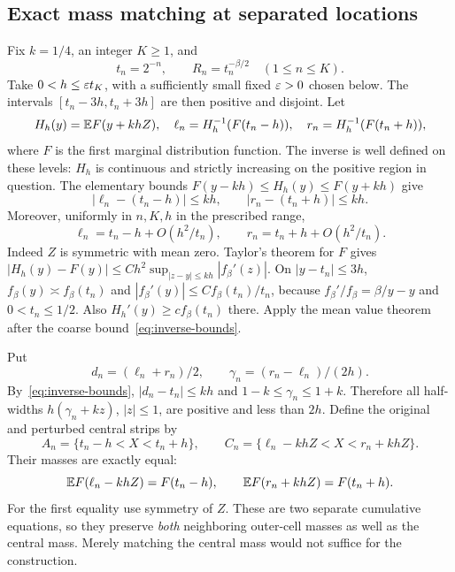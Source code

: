\documentclass[11pt]{article}
\theoremstyle{remark}\newtheorem{remark}[theorem]{Remark}
\begin{document}
\subsection{Exact mass matching at separated locations}
Fix $k=1/4$, an integer $K\ge1$, and
\[
 t_n=2^{-n},\qquad R_n=t_n^{-\beta/2}\quad(1\le n\le K).
\]
Take $0<h\le\varepsilon t_K$, with a sufficiently small fixed $\varepsilon>0$ chosen below. The intervals $[t_n-3h,t_n+3h]$ are then positive and disjoint. Let
\[
 H_h(y)=\mathbb E F(y+khZ),\quad
 \ell_n=H_h^{-1}(F(t_n-h)),\quad
 r_n=H_h^{-1}(F(t_n+h)),
\]
where $F$ is the first marginal distribution function. The inverse is well defined on these levels: $H_h$ is continuous and strictly increasing on the positive region in question. The elementary bounds
$F(y-kh)\le H_h(y)\le F(y+kh)$ give
\begin{equation}\label{eq:inverse-bounds}
 |\ell_n-(t_n-h)|\le kh,\qquad
 |r_n-(t_n+h)|\le kh.
\end{equation}
Moreover, uniformly in $n,K,h$ in the prescribed range,
\begin{equation}\label{eq:inverse-fine}
 \ell_n=t_n-h+O(h^2/t_n),\qquad
 r_n=t_n+h+O(h^2/t_n).
\end{equation}
Indeed $Z$ is symmetric with mean zero. Taylor's theorem for $F$ gives
$|H_h(y)-F(y)|\le C h^2\sup_{|z-y|\le kh}|f_\beta'(z)|$.
On $|y-t_n|\le3h$, $f_\beta(y)\asymp f_\beta(t_n)$ and
$|f_\beta'(y)|\le C f_\beta(t_n)/t_n$, because
$f_\beta'/f_\beta=\beta/y-y$ and $0<t_n\le1/2$. Also $H_h'(y)\ge c f_\beta(t_n)$ there. Apply the mean value theorem after the coarse bound~\eqref{eq:inverse-bounds}.

Put
\[
 d_n=(\ell_n+r_n)/2,\qquad \gamma_n=(r_n-\ell_n)/(2h).
\]
By~\eqref{eq:inverse-bounds}, $|d_n-t_n|\le kh$ and
$1-k\le\gamma_n\le1+k$. Therefore all half-widths
$h(\gamma_n+kz)$, $|z|\le1$, are positive and less than $2h$.
Define the original and perturbed central strips by
\[
 A_n=\{t_n-h<X<t_n+h\},\qquad
 C_n=\{\ell_n-khZ<X<r_n+khZ\}.
\]
Their masses are exactly equal:
\begin{equation}\label{eq:two-cumulative}
 \mathbb E F(\ell_n-khZ)=F(t_n-h),\qquad
 \mathbb E F(r_n+khZ)=F(t_n+h).
\end{equation}
For the first equality use symmetry of $Z$. These are two separate cumulative equations, so they preserve \emph{both} neighboring outer-cell masses as well as the central mass. Merely matching the central mass would not suffice for the construction.
\end{document}
